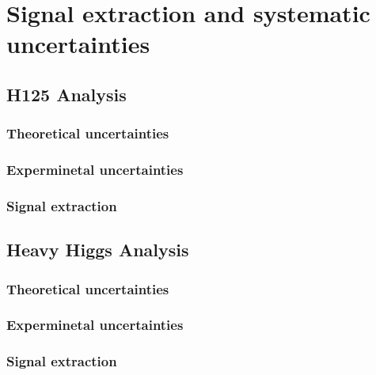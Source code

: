 
%
%

\chapter{Signal extraction and systematic uncertainties}
\label{sig_ext}


\section{H125 Analysis}
\label{h125_sys}

\subsection{Theoretical uncertainties}
\label{theo_uncert}

\subsection{Experminetal uncertainties}
\label{exp_uncert}

\subsection{Signal extraction}
\label{sig_ext}


\section{Heavy Higgs Analysis}
\label{hh_sys}

\subsection{Theoretical uncertainties}
\label{theo_uncert}

\subsection{Experminetal uncertainties}
\label{exp_uncert}

\subsection{Signal extraction}
\label{sig_ext}

%
% 
% 


